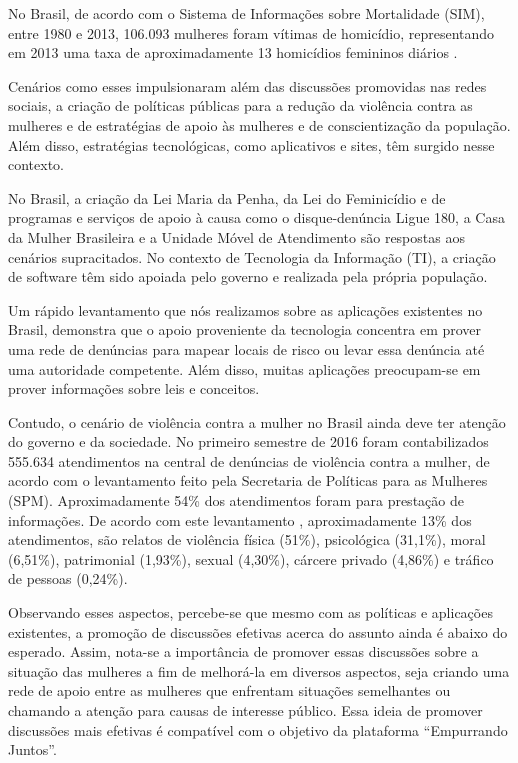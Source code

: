 No Brasil, de acordo com o Sistema de Informações sobre Mortalidade (SIM), entre 1980 e 2013, 106.093 mulheres foram vítimas de homicídio, 
representando em 2013 uma taxa de aproximadamente 13 homicídios femininos
diários \cite{mapa_violencia_2015}. 

Cenários como esses impulsionaram além das discussões promovidas nas redes sociais, a criação de políticas públicas para a redução da violência 
contra as mulheres e de estratégias de apoio às mulheres e de conscientização da população. Além disso, estratégias tecnológicas, 
como aplicativos e sites, têm surgido nesse contexto.

No Brasil, a criação da Lei Maria da Penha, da Lei do Feminicídio e de programas e serviços de apoio à causa 
como o disque-denúncia Ligue 180, a Casa da Mulher Brasileira e a Unidade Móvel de Atendimento são respostas aos cenários supracitados. 
No contexto de Tecnologia da Informação (TI), a criação de software têm sido apoiada pelo governo e realizada pela própria população.

Um rápido levantamento que nós realizamos sobre as aplicações existentes no Brasil, demonstra que o apoio proveniente da tecnologia concentra em 
prover uma rede de denúncias para mapear locais de risco ou levar essa denúncia até uma autoridade competente. Além disso, muitas aplicações 
preocupam-se em prover informações sobre leis e conceitos.

Contudo, o cenário de violência contra a mulher no Brasil ainda deve ter atenção do governo e da sociedade. No primeiro semestre de 2016 
foram contabilizados 555.634 atendimentos na central de denúncias 
de violência contra a mulher, de acordo com o levantamento feito pela Secretaria de Políticas para as Mulheres (SPM). 
Aproximadamente 54\% dos atendimentos foram para prestação de informações. De acordo com este levantamento \cite{portal_180}, aproximadamente 13\% dos 
atendimentos, 
são relatos de violência física (51\%), psicológica (31,1\%), moral (6,51\%), patrimonial (1,93\%), sexual (4,30\%), cárcere privado (4,86\%) e 
tráfico de pessoas (0,24\%).

Observando esses aspectos, percebe-se que mesmo com as políticas e aplicações existentes, a promoção de discussões efetivas acerca do 
assunto ainda é abaixo do esperado. Assim, nota-se a importância de promover essas discussões sobre a situação das mulheres a fim de 
melhorá-la em diversos aspectos, seja criando uma rede de apoio entre as mulheres que enfrentam situações semelhantes ou chamando a atenção 
para causas de interesse público. Essa ideia de promover discussões mais efetivas é compatível com o objetivo da plataforma ``Empurrando Juntos''.

